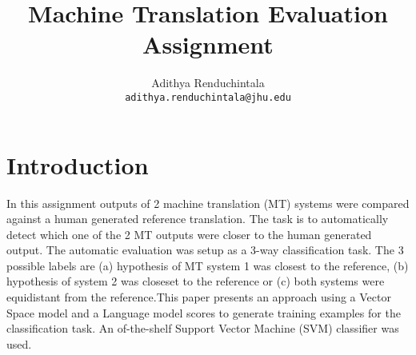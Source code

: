 \documentclass[11pt]{article}
\title{Machine Translation Evaluation Assignment}
\author{Adithya Renduchintala \\
  {\tt adithya.renduchintala@jhu.edu}\\
  }
\date{}
\begin{document}
\maketitle


\section{Introduction}
In this assignment  outputs of 2 machine translation (MT)
systems were compared against a human generated reference translation. The task
is to automatically detect which one of the 2 MT outputs were closer to the
human generated output. The automatic evaluation was setup as a 3-way
classification task. The 3 possible labels are (a) hypothesis of MT system 1
was closest to the reference, (b) hypothesis of system 2 was closeset to the
reference or (c) both systems were equidistant from the reference.This paper
presents an approach using a Vector Space model and a Language model scores to 
generate training examples for the classification task. An of-the-shelf Support 
Vector Machine (SVM) classifier was used.
\end{document}
